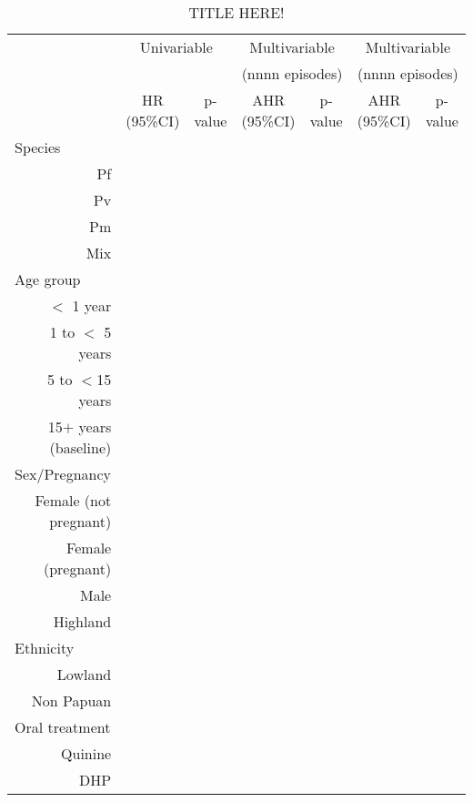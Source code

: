 \begin{table}\centering
\begin{adjustwidth}{-1.5cm}{}
\footnotesize
\caption{		TITLE HERE!
\label{table:tabM1}}
\begin{tabular}{rcccccc}
\toprule
&								\multicolumn{2}{c}{Univariable}			& \multicolumn{2}{c}{Multivariable} & \multicolumn{2}{c}{Multivariable} \\
&							&				& \multicolumn{2}{c}{(nnnn episodes)} & \multicolumn{2}{c}{(nnnn episodes)}			\\
\cmidrule(lr){2-3}  \cmidrule(lr){4-5}  \cmidrule(lr){6-7}										
										&  HR (95\%CI)       	&	  p-value   &	AHR (95\%CI)  		   & p-value    &		AHR (95\%CI)    & p-value 	\\	
\midrule										
 \multicolumn{1}{l}{Species}	& & & & & &  \\	
				   Pf 								&	&	 &	 &			 &			&				 \\
				   Pv 								&	&	 &   &			 &			&				 \\
				   Pm 								&	&	 &   &			 &			&				 \\
				   Mix								&	&	 &	 &			 &			&				 \\  [3.5pt]
 \multicolumn{1}{l}{Age group}	& & & & & &  \\									
	   	  $<$ 1 year  								&	&	 &   &			 &			&				 \\
	 1 to $<$ 5 years 								&	&	 &   &			 &			&				 \\
	 5 to $<$15 years 								&	&	 &   &			 &			&				 \\
15$+$ years (baseline)								&	&	 &   &			 &			&				 \\
 \multicolumn{1}{l}{Sex/Pregnancy}	& & & & & &  \\								
 Female (not pregnant)  							&	&	 &   &			 &			&				 \\  [3.5pt]
  	 Female (pregnant)  							&	&	 &   &			 &			&				 \\
				Male  								&	&	 &   &			 &			&				 \\
			Highland    							&	&	 &   &			 &			&				 \\  [3.5pt]
 \multicolumn{1}{l}{Ethnicity}	& & & & & &  \\									
				Lowland								&	&	 &   &			 &			&				 \\
			Non Papuan 								&	&	 &   &			 &			&				 \\
  \multicolumn{1}{l}{Oral treatment}& & & & & &  \\	       				  			
			  Quinine 								& 	&  	 &   &			 &			&				 \\  [3.5pt]
				  DHP 								& 	&  	 &   &			 &			&				 \\


\end{tabular}
\end{adjustwidth}
\end{table}

